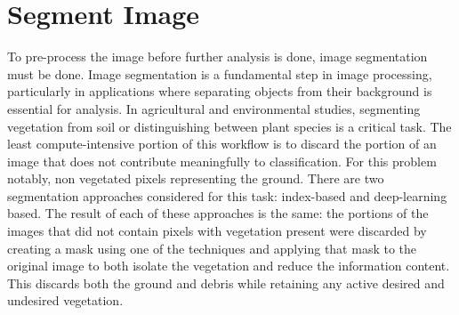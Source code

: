 \documentclass[letterpaper]{report}
\begin{document}
%
%
\section{Segment Image}
\label{section:segmentation}
To pre-process the image before further analysis is done, image segmentation must be done.  Image segmentation is a fundamental step in image processing, particularly in applications where separating objects from their background is essential for analysis. In agricultural and environmental studies, segmenting vegetation from soil or distinguishing between plant species is a critical task. The least compute-intensive portion of this workflow is to discard the portion of an image that does not contribute meaningfully to classification. For this problem notably, non vegetated pixels representing the ground. There are two segmentation approaches considered for this task: index-based and deep-learning based. The result of each of these approaches is the same: the portions of the images that did not contain pixels with vegetation present were discarded by creating a mask using one of the techniques and applying that mask to the original image to both isolate the vegetation and reduce the information content. This discards both the ground and debris while retaining any active desired and undesired vegetation. 
\end{document}

